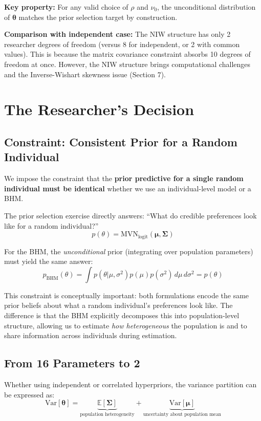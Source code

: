 \documentclass[11pt]{article}
\newcommand{\E}{\mathbb{E}}
\newcommand{\Var}{\text{Var}}
\begin{document}
\textbf{Key property:} For any valid choice of $\rho$ and $\nu_0$, the unconditional distribution of $\boldsymbol{\theta}$ matches the prior selection target by construction.

\textbf{Comparison with independent case:} The NIW structure has only 2 researcher degrees of freedom (versus 8 for independent, or 2 with common values). This is because the matrix covariance constraint absorbs 10 degrees of freedom at once. However, the NIW structure brings computational challenges and the Inverse-Wishart skewness issue (Section 7).

\section{The Researcher's Decision}

\subsection{Constraint: Consistent Prior for a Random Individual}

We impose the constraint that the \textbf{prior predictive for a single random individual must be identical} whether we use an individual-level model or a BHM.

The prior selection exercise directly answers: ``What do credible preferences look like for a random individual?''
\[
  p(\theta) = \text{MVN}_{\text{logit}}(\boldsymbol{\mu}, \boldsymbol{\Sigma})
\]

For the BHM, the \textit{unconditional} prior (integrating over population parameters) must yield the same answer:
\[
  p_{\text{BHM}}(\theta) = \int p(\theta | \mu, \sigma^2) p(\mu) p(\sigma^2) \, d\mu \, d\sigma^2 = p(\theta)
\]

This constraint is conceptually important: both formulations encode the same prior beliefs about what a random individual's preferences look like. The difference is that the BHM explicitly decomposes this into population-level structure, allowing us to estimate \textit{how heterogeneous} the population is and to share information across individuals during estimation.

\subsection{From 16 Parameters to 2}

Whether using independent or correlated hyperpriors, the variance partition can be expressed as:
\[
  \Var[\boldsymbol{\theta}] = \underbrace{\E[\boldsymbol{\Sigma}]}_{\text{population heterogeneity}} + \underbrace{\Var[\boldsymbol{\mu}]}_{\text{uncertainty about population mean}}
\]
\end{document}
